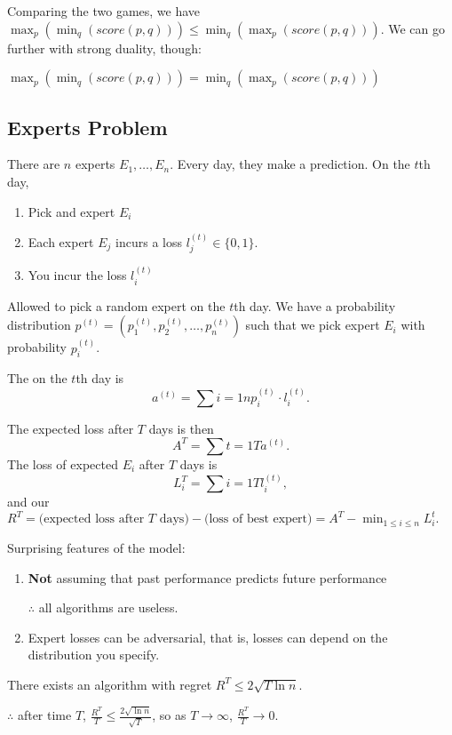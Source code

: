 \documentclass{article}
\begin{document}
Comparing the two games, we have $\max_p(\min_q(score(p, q))) \leq \min_q(\max_p(score(p, q)))$. We can go further with strong duality, though:

\begin{theorem}
    $\max_p(\min_q(score(p, q))) = \min_q(\max_p(score(p, q)))$
\end{theorem}

\subsection{Experts Problem}
There are $n$ experts $E_1, \ldots, E_n$. Every day, they make a prediction. On the $t$th day, 
\begin{enumerate}
    \item Pick and expert $E_i$
    \item Each expert $E_j$ incurs a loss $l_j^{(t)} \in \{0, 1\}$. 
    \item You incur the loss $l_i^{(t)}$
\end{enumerate}

Allowed to pick a random expert on the $t$th day. We have a probability distribution $p^{(t)} = (p_1^{(t)}, p_2^{(t)}, \ldots, p_n^{(t)})$ such that we pick expert $E_i$ with probability $p_i^{(t)}$.

The  on the $t$th day is \[a^{(t)} = \sum{i=1}{n} p_i^{(t)} \cdot l_i^{(t)}.\] 

The expected loss after $T$ days is then \[A^T = \sum{t = 1}{T} a^{(t)}.\] The loss of expected $E_i$ after $T$ days is \[L_i^T = \sum{i = 1}{T} l_i^{(t)},\] and our  $R^T = \text{(expected loss after }T\text{ days)} - \text{(loss of best expert)} = A^T - \min_{1 \leq i \leq n} L_i^t.$

\begin{remark}
Surprising features of the model:
\begin{enumerate}
    \item \textbf{Not} assuming that past performance predicts future performance

    $\therefore$ all algorithms are useless.
    \item Expert losses can be adversarial, that is, losses can depend on the distribution you specify.
\end{enumerate}
\end{remark}

\begin{theorem}
    There exists an algorithm with regret $R^T \leq 2 \sqrt{T \ln n}$.

    $\therefore$ after time $T$,  $\frac{R^T}{T} \leq \frac{2 \sqrt{\ln n}}{\sqrt T}$, so as $T \to \infty$, $\frac{R^T}{T} \to 0$.
\end{theorem}
\end{document}
